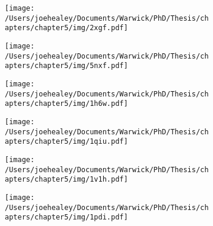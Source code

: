 \vspace{0.1cm}
\begin{figure}[p]
\centering
    \begin{subfigure}{\textwidth}
        \centering
        \texttt{[image: /Users/joehealey/Documents/Warwick/PhD/Thesis/chapters/chapter5/img/2xgf.pdf]}
        \captionsetup{singlelinecheck=off, justification=centering, font=footnotesize, aboveskip=10pt}
        \caption{}
    \end{subfigure}%
    
     \begin{subfigure}{\textwidth}
        \centering
        \texttt{[image: /Users/joehealey/Documents/Warwick/PhD/Thesis/chapters/chapter5/img/5nxf.pdf]}
        \captionsetup{singlelinecheck=off, justification=centering, font=footnotesize, aboveskip=10pt}
        \caption{}
    \end{subfigure}%
    
    \begin{subfigure}{0.49\textwidth}
            \centering
            {%
            \texttt{[image: /Users/joehealey/Documents/Warwick/PhD/Thesis/chapters/chapter5/img/1h6w.pdf]}
            }%
            \captionsetup{singlelinecheck=off, justification=centering, font=footnotesize, aboveskip=10pt}
            \caption{}
        \end{subfigure}%
            \begin{subfigure}{0.49\textwidth}
            \centering
            {%
            \texttt{[image: /Users/joehealey/Documents/Warwick/PhD/Thesis/chapters/chapter5/img/1qiu.pdf]}
            }%
            \captionsetup{singlelinecheck=off, justification=centering, font=footnotesize, aboveskip=10pt}
            \caption{}
            \label{1qiu}
        \end{subfigure}%
        
        \begin{subfigure}{0.49\textwidth}
            \centering
            {%
            \texttt{[image: /Users/joehealey/Documents/Warwick/PhD/Thesis/chapters/chapter5/img/1v1h.pdf]}
            }%
           \captionsetup{singlelinecheck=off, justification=centering, font=footnotesize, aboveskip=10pt}
            \caption{}
            \label{1v1h}
        \end{subfigure}%
        \begin{subfigure}{0.49\textwidth}
            \centering
            {%
            \texttt{[image: /Users/joehealey/Documents/Warwick/PhD/Thesis/chapters/chapter5/img/1pdi.pdf]}
            }%
           \captionsetup{singlelinecheck=off, justification=centering, font=footnotesize, aboveskip=10pt}
            \caption{}            
        \end{subfigure}%
        

\end{figure}

